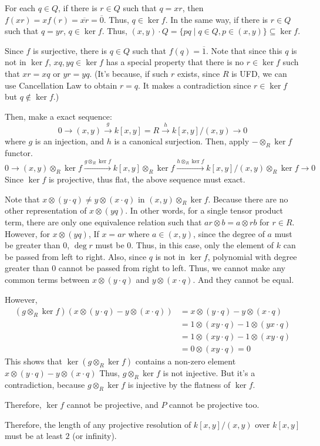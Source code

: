 For each \(q \in Q\), if there is \(r \in Q\) such that
\(q = xr\),
then \(f(xr) = xf(r) = \overline{xr} = \overline{0}\).
Thus, \(q \in \ker f\).
In the same way, if there is \(r \in Q\) such that
\(q = yr\),
\(q \in \ker f\).
Thus, \((x, y) \cdot Q = \{pq \mid q \in Q, p \in (x, y)\} \subseteq \ker f\).

Since \(f\) is surjective, there is \(q \in Q\)
such that \(f(q) = \overline{1}\).
Note that since this \(q\) is not in \(\ker f\),
\(xq, yq \in \ker f\)
has a special property that there is no \(r \in \ker f\)
such that \(xr = xq\) or \(yr = yq\).
(It's because, if such \(r\) exists,
since \(R\) is UFD,
we can use Cancellation Law to obtain \(r = q\).
It makes a contradiction since \(r \in \ker f\) but \(q \not\in \ker f\).)

Then, make a exact sequence:
\[0 \to (x, y) \xrightarrow{g} k[x, y] = R \xrightarrow{h} k[x,y]/(x,y) \to 0\]
where \(g\) is an injection, and \(h\) is a canonical surjection.
Then, apply \(- \otimes_{R} \ker f\) functor.
\[0 \to
(x, y) \otimes_{R} \ker f \xrightarrow{g \otimes_{R} \ker f}
k[x, y] \otimes_{R} \ker f \xrightarrow{h \otimes_{R} \ker f}
k[x,y]/(x,y) \otimes_{R} \ker f \to 0\]
Since \(\ker f\) is projective, thus flat, the above sequence must exact.

Note that \(x \otimes (y \cdot q) \neq y \otimes (x \cdot q)\)
in \((x, y) \otimes_R \ker f\).
Because there are no other representation of \(x \otimes (yq)\).
In other words, for a single tensor product term,
there are only one equivalence relation such that
\(ar \otimes b = a \otimes rb\) for \(r \in R\).
However, for \(x \otimes (yq)\),
If \(x = ar\) where \(a \in (x, y)\), since the degree of \(a\) must be greater
than 0, \(\deg r\) must be 0.
Thus, in this case, only the element of \(k\) can be passed from left to right.
Also, since \(q\) is not in \(\ker f\),
polynomial with degree greater than 0 cannot be passed from right to left.
Thus, we cannot make any common terms between
\(x \otimes (y \cdot q)\) and \(y \otimes (x \cdot q)\).
And they cannot be equal.

However,
\begin{align*}
  (g \otimes_R \ker f)(x \otimes (y \cdot q) - y \otimes (x \cdot q))
  &= x \otimes (y \cdot q) - y \otimes (x \cdot q)
  \\&= 1 \otimes (xy \cdot q) - 1 \otimes (yx \cdot q)
  \\&= 1 \otimes (xy \cdot q) - 1 \otimes (xy \cdot q)
  \\&= 0 \otimes (xy \cdot q) = 0
\end{align*}
This shows that \(\ker (g \otimes_R \ker f)\)
contains a non-zero element \(x \otimes (y \cdot q) - y \otimes (x \cdot q)\)
Thus, \(g \otimes_R \ker f\) is not injective.
But it's a contradiction,
because \(g \otimes_R \ker f\) is injective by the flatness of \(\ker f\).

Therefore, \(\ker f\) cannot be projective,
and \(P\) cannot be projective too.

Therefore, the length of any projective resolution of \(k[x, y]/(x, y)\)
over \(k[x, y]\) must be at least \(2\) (or infinity).
\qedsq